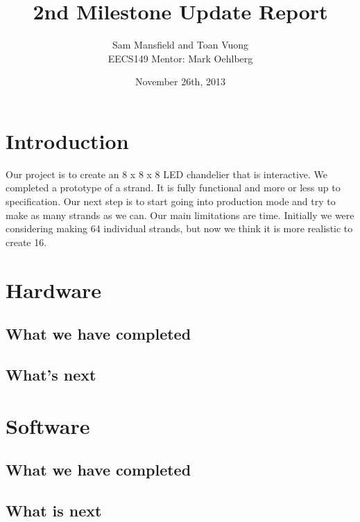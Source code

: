 \documentclass[10pt]{article}
\begin{document}
  \title{2nd Milestone Update Report}
  \author{Sam Mansfield and Toan Vuong\\
          EECS149
          Mentor: Mark Oehlberg}
  \date{November 26th, 2013}
  
  \maketitle

  \section{Introduction}
    Our project is to create an 8 x 8 x 8 LED chandelier that is interactive. We completed a prototype of a strand. It is fully functional and more or less up to specification. Our next step is to start going into production mode and try to make as many strands as we can. Our main limitations are time. Initially we were considering making 64 individual strands, but now we think it is more realistic to create 16.
    
  \section{Hardware}
    \subsection{What we have completed}

    \subsection{What's next}

  \section{Software}
    \subsection{What we have completed}
    
    \subsection{What is next}
\end{document}

